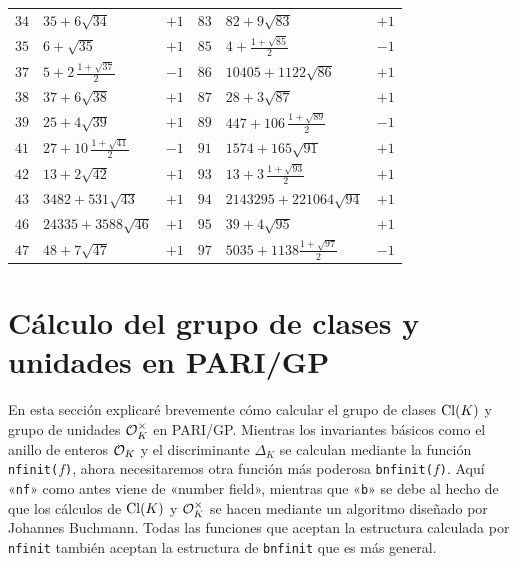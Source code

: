 \begin{center}
\begin{tabular}{M{0.5cm}M{4cm}M{0.7cm}|M{0.5cm}M{4cm}M{0.7cm}}
    $34$ & $35 + 6\sqrt{34}$ & $+1$ & $83$ & $82 + 9\sqrt{83}$ & $+1$ \\
    $35$ & $6 + \sqrt{35}$ & $+1$ & $85$ & $4 + \frac{1+\sqrt{85}}{2}$ & $-1$ \\
    $37$ & $5 + 2\,\frac{1+\sqrt{37}}{2}$ & $-1$ & $86$ & $10405 + 1122\sqrt{86}$ & $+1$ \\
    $38$ & $37 + 6\sqrt{38}$ & $+1$ & $87$ & $28 + 3\sqrt{87}$ & $+1$ \\
    $39$ & $25 + 4\sqrt{39}$ & $+1$ & $89$ & $447 + 106\,\frac{1+\sqrt{89}}{2}$ & $-1$ \\
    $41$ & $27 + 10\,\frac{1+\sqrt{41}}{2}$ & $-1$ & $91$ & $1574 + 165\sqrt{91}$ & $+1$ \\
    $42$ & $13 + 2\sqrt{42}$ & $+1$ & $93$ & $13 + 3\,\frac{1+\sqrt{93}}{2}$ & $+1$ \\
    $43$ & $3482 + 531\sqrt{43}$ & $+1$ & $94$ & $2143295 + 221064\sqrt{94}$ & $+1$ \\
    $46$ & $24335 + 3588\sqrt{46}$ & $+1$ & $95$ & $39 + 4\sqrt{95}$ & $+1$ \\
    $47$ & $48 + 7\sqrt{47}$ & $+1$ & $97$ & $5035 + 1138\frac{1+\sqrt{97}}{2}$ & $-1$ \\
  \end{tabular}
  \egroup
\end{center}


\section{Cálculo del grupo de clases y unidades en PARI/GP}

En esta sección explicaré brevemente cómo calcular el grupo de clases $\operatorname{Cl} (K)$
y grupo de unidades $\mathcal{O}_K^\times$ en PARI/GP. Mientras los invariantes básicos
como el anillo de enteros $\mathcal{O}_K$ y el discriminante $\Delta_K$ se calculan
mediante la función \texttt{nfinit($f$)}, ahora necesitaremos otra función más
poderosa \texttt{bnfinit($f$)}. Aquí «\texttt{nf}» como antes viene de
«number field», mientras que «\texttt{b}» se debe al hecho de que los cálculos
de $\operatorname{Cl} (K)$ y $\mathcal{O}_K^\times$ se hacen mediante un algoritmo diseñado por
Johannes Buchmann. Todas las funciones que aceptan la estructura calculada por
\texttt{nfinit} también aceptan la estructura de \texttt{bnfinit} que es
más general.

